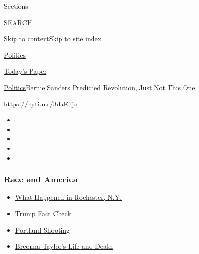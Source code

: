 Sections

SEARCH

\protect\hyperlink{site-content}{Skip to
content}\protect\hyperlink{site-index}{Skip to site index}

\href{https://www.nytimes3xbfgragh.onion/section/politics}{Politics}

\href{https://myaccount.nytimes3xbfgragh.onion/auth/login?response_type=cookie\&client_id=vi}{}

\href{https://www.nytimes3xbfgragh.onion/section/todayspaper}{Today's
Paper}

\href{/section/politics}{Politics}\textbar{}Bernie Sanders Predicted
Revolution, Just Not This One

\url{https://nyti.ms/3daE1jn}

\begin{itemize}
\item
\item
\item
\item
\item
\end{itemize}

\hypertarget{race-and-america}{%
\subsubsection{\texorpdfstring{\href{https://www.nytimes3xbfgragh.onion/news-event/george-floyd-protests-minneapolis-new-york-los-angeles?name=styln-george-floyd\&region=TOP_BANNER\&block=storyline_menu_recirc\&action=click\&pgtype=Article\&impression_id=4c15be80-f28f-11ea-8c44-5749c33336ea\&variant=undefined}{Race
and America}}{Race and America}}\label{race-and-america}}

\begin{itemize}
\tightlist
\item
  \href{https://www.nytimes3xbfgragh.onion/2020/09/04/nyregion/rochester-police-daniel-prude.html?name=styln-george-floyd\&region=TOP_BANNER\&block=storyline_menu_recirc\&action=click\&pgtype=Article\&impression_id=4c15be81-f28f-11ea-8c44-5749c33336ea\&variant=undefined}{What
  Happened in Rochester, N.Y.}
\item
  \href{https://www.nytimes3xbfgragh.onion/2020/09/01/us/politics/trump-fact-check-protests.html?name=styln-george-floyd\&region=TOP_BANNER\&block=storyline_menu_recirc\&action=click\&pgtype=Article\&impression_id=4c15be82-f28f-11ea-8c44-5749c33336ea\&variant=undefined}{Trump
  Fact Check}
\item
  \href{https://www.nytimes3xbfgragh.onion/2020/08/30/us/portland-shooting-explained.html?name=styln-george-floyd\&region=TOP_BANNER\&block=storyline_menu_recirc\&action=click\&pgtype=Article\&impression_id=4c15e590-f28f-11ea-8c44-5749c33336ea\&variant=undefined}{Portland
  Shooting}
\item
  \href{https://www.nytimes3xbfgragh.onion/2020/08/30/us/breonna-taylor-police-killing.html?name=styln-george-floyd\&region=TOP_BANNER\&block=storyline_menu_recirc\&action=click\&pgtype=Article\&impression_id=4c15e591-f28f-11ea-8c44-5749c33336ea\&variant=undefined}{Breonna
  Taylor's Life and Death}
\end{itemize}

